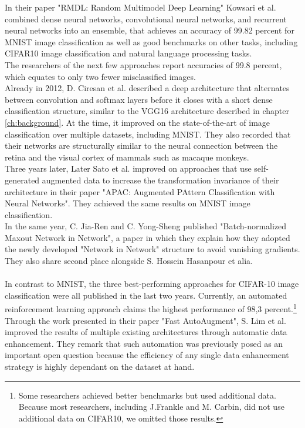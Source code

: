 In their paper "RMDL: Random Multimodel Deep Learning" Kowsari et al. combined dense neural networks, convolutional neural networks, and recurrent neural networks into an ensemble, that achieves an accuracy of 99.82 percent for MNIST image classification as well as good benchmarks on other tasks, including CIFAR10 image classification and natural language processing tasks.\cite{RMDL}\\
The researchers of the next few approaches report accuracies of 99.8 percent, which equates to only two fewer misclassified images.\\
Already in 2012, D. Ciresan et al. described a deep architecture that alternates between convolution and softmax layers before it closes with a short dense classification structure, similar to the VGG16 architecture described in chapter \ref{ch:background}. At the time, it improved on the state-of-the-art of image classification over multiple datasets, including MNIST. They also recorded that their networks are structurally similar to the neural connection between the retina and the visual cortex of mammals such as macaque monkeys.\cite{Multi-Column}\\
Three years later, Later Sato et al. improved on approaches that use self-generated augmented data to increase the transformation invariance of their architecture in their paper "APAC: Augmented PAttern Classification with Neural Networks". They achieved the same results on MNIST image classification.\cite{APAC}\\
In the same year, C. Jia-Ren and C. Yong-Sheng published "Batch-normalized Maxout Network in Network", a paper in which they explain how they adopted the newly developed "Network in Network" structure to avoid vanishing gradients.\cite{Batch-Normalized}\\
 They also share second place alongside S. Hossein Hasanpour et alia.\cite{Keep-It-Simple}\\
\\
In contrast to MNIST, the three best-performing approaches for CIFAR-10 image classification were all published in the last two years. Currently, an automated reinforcement learning approach claims the highest performance of 98,3 percent.\footnote{Some researchers achieved better benchmarks but used additional data. Because most researchers, including J.Frankle and M. Carbin, did not use additional data on CIFAR10, we omitted those results.}
Through the work presented in their paper "Fast AutoAugment", S. Lim et al. improved the results of multiple existing architectures through automatic data enhancement. They remark that such automation was previously posed as an important open question because the efficiency of any single data enhancement strategy is highly dependant on the dataset at hand.\cite{Auto-Augment}\\
